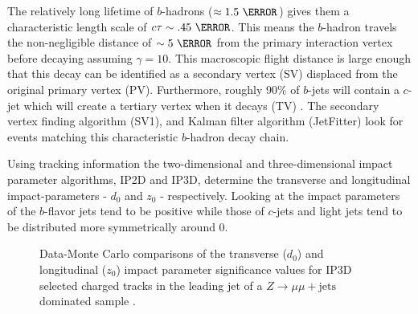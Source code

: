The relatively long lifetime of $b$-hadrons ($\approx 1.5~\ps$) gives them a
characteristic length scale of  $c\tau \sim .45~\mm$. This means the $b$-hadron
travels the non-negligible distance of $\sim 5~\mm$  from the primary
interaction vertex before decaying assuming $\gamma = 10$.  This macroscopic
flight distance is large enough that this decay can be identified as a
secondary vertex (SV) displaced from the original primary vertex (PV).
Furthermore, roughly 90\% of $b$-jets will contain a $c$-jet which will create
a tertiary vertex when it decays (TV) \cite{Chisholm:bjet}.  The secondary
vertex finding algorithm (SV1), and Kalman filter algorithm (JetFitter) look
for events matching this characteristic $b$-hadron decay chain. 

Using tracking information the two-dimensional and three-dimensional impact
parameter algorithms, IP2D and IP3D, determine the transverse and longitudinal
impact-parameters - $d_{\text{0}}$ and $z_{\text{0}}$ - respectively. Looking
at  the impact parameters of
the $b$-flavor jets tend to be positive while those of $c$-jets and light jets
tend to be distributed more symmetrically around 0.

\begin{figure}[!htbp]
  \centering
   \hfill

  \caption{Data-Monte Carlo comparisons of the
transverse ($d_{0}$) and longitudinal ($z_{0}$) impact parameter significance
values for IP3D selected charged tracks in the leading jet of a $Z\to\mu\mu +
\text{jets}$ dominated sample \cite{Chisholm:bjet}.}
  \label{sec:objects:impact_parameters}
\end{figure}

